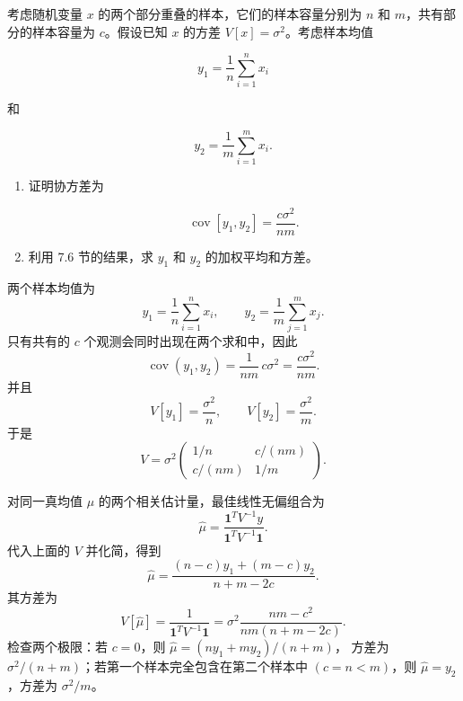 \begin{question}
考虑随机变量 \(x\) 的两个部分重叠的样本，它们的样本容量分别为 \(n\) 和
\(m\)，共有部分的样本容量为 \(c\)。假设已知 \(x\) 的方差
\(V[x]=\sigma^2\)。考虑样本均值

\[
y_1=\frac1n\sum_{i=1}^{n}x_i
\]

和

\[
y_2=\frac1m\sum_{i=1}^{m}x_i.
\]

\begin{enumerate}
\item 证明协方差为

\[
\operatorname{cov}[y_1,y_2]=\frac{c\sigma^2}{nm}.
\]

\item 利用 7.6 节的结果，求 \(y_1\) 和 \(y_2\) 的加权平均和方差。
\end{enumerate}
\begin{solution}
两个样本均值为
\[
y_1=\frac1n\sum_{i=1}^n x_i,
\qquad
y_2=\frac1m\sum_{j=1}^m x_j.
\]
只有共有的 \(c\) 个观测会同时出现在两个求和中，因此
\[
\operatorname{cov}(y_1,y_2)
=\frac{1}{nm}\,c\sigma^2
=\frac{c\sigma^2}{nm}.
\]
并且
\[
V[y_1]=\frac{\sigma^2}{n},
\qquad
V[y_2]=\frac{\sigma^2}{m}.
\]
于是
\[
V=\sigma^2
\begin{pmatrix}
1/n & c/(nm)\\[3pt]
c/(nm)&1/m
\end{pmatrix}.
\]

对同一真均值 \(\mu\) 的两个相关估计量，最佳线性无偏组合为
\[
\hat\mu=\frac{\mathbf 1^T V^{-1}y}{\mathbf 1^T V^{-1}\mathbf 1}.
\]
代入上面的 \(V\) 并化简，得到
\[
\hat\mu
=\frac{(n-c)y_1+(m-c)y_2}{n+m-2c}.
\]
其方差为
\[
V[\hat\mu]
=\frac{1}{\mathbf 1^T V^{-1}\mathbf 1}
=\sigma^2\frac{nm-c^2}{nm(n+m-2c)}.
\]
检查两个极限：若 \(c=0\)，则 \(\hat\mu=(ny_1+my_2)/(n+m)\)，
方差为 \(\sigma^2/(n+m)\)；若第一个样本完全包含在第二个样本中
\((c=n<m)\)，则 \(\hat\mu=y_2\)，方差为 \(\sigma^2/m\)。
\end{solution}
\end{question}


